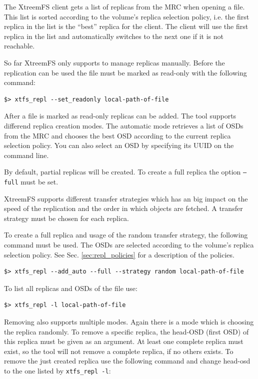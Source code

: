 \documentclass[a4paper,10pt]{book}
\begin{document}
The XtreemFS client gets a list of replicas from the MRC when opening a file. This list is sorted according to the volume's replica selection policy, i.e. the first replica in the list is the ``best'' replica for the client. The client will use the first replica in the list and automatically switches to the next one if it is not reachable.

So far XtreemFS only supports to manage replicas manually. Before the replication can be used the file must be marked as read-only with the following command:

\begin{verbatim}
$> xtfs_repl --set_readonly local-path-of-file
\end{verbatim}

After a file is marked as read-only replicas can be added. The tool supports differend replica creation modes. The automatic mode retrieves a list of OSDs from the MRC and chooses the best OSD according to the current replica selection policy. You can also select an OSD by specifying its UUID on the command line.

By default, partial replicas will be created. To create a full replica the option \texttt{--full} must be set.

XtreemFS supports different transfer strategies which has an big impact on the speed of the replication and the order in which objects are fetched. A transfer strategy must be chosen for each replica.

To create a full replica and usage of the random transfer strategy, the following command must be used. The OSDs are selected according to the volume's replica selection policy. See Sec. \ref{sec:repl_policies} for a description of the policies.

\begin{verbatim}
$> xtfs_repl --add_auto --full --strategy random local-path-of-file
\end{verbatim}

To list all replicas and OSDs of the file use:

\begin{verbatim}
$> xtfs_repl -l local-path-of-file
\end{verbatim}

Removing also supports multiple modes. Again there is a mode which is choosing the replica randomly. To remove a specific replica, the head-OSD (first OSD) of this replica must be given as an argument. At least one complete replica must exist, so the tool will not remove a complete replica, if no others exists. To remove the just created replica use the following command and change head-osd to the one listed by \texttt{xtfs\_repl -l}:
\end{document}
